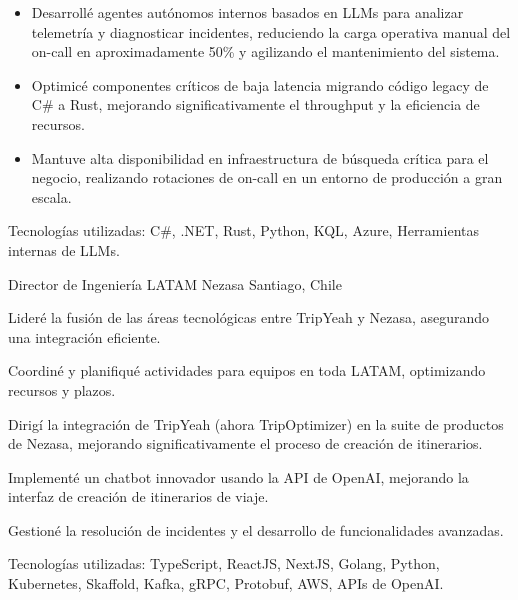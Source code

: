 \begin{cventries}
{\begin{cvitems}
{\begin{itemize}
                \item {Desarrollé agentes autónomos internos basados en LLMs para analizar telemetría y diagnosticar incidentes, reduciendo la carga operativa manual del on-call en aproximadamente 50\% y agilizando el mantenimiento del sistema.}
                \item {Optimicé componentes críticos de baja latencia migrando código legacy de C\# a Rust, mejorando significativamente el throughput y la eficiencia de recursos.}
                \item {Mantuve alta disponibilidad en infraestructura de búsqueda crítica para el negocio, realizando rotaciones de on-call en un entorno de producción a gran escala.}
              \end{itemize}
            }
            \item {Tecnologías utilizadas: C\#, .NET, Rust, Python, KQL, Azure, Herramientas internas de LLMs.}
        \end{cvitems}
    }
  \cventry
    {Director de Ingeniería LATAM} %
    {Nezasa} %
    {Santiago, Chile} %
    {} %
    {
      \begin{cvitems} %
        \item {Lideré la fusión de las áreas tecnológicas entre TripYeah y Nezasa, asegurando una integración eficiente.}
        \item {Coordiné y planifiqué actividades para equipos en toda LATAM, optimizando recursos y plazos.}
        \item {Dirigí la integración de TripYeah (ahora TripOptimizer) en la suite de productos de Nezasa, mejorando significativamente el proceso de creación de itinerarios.}
        \item {Implementé un chatbot innovador usando la API de OpenAI, mejorando la interfaz de creación de itinerarios de viaje.}
        \item {Gestioné la resolución de incidentes y el desarrollo de funcionalidades avanzadas.}
        \item {Tecnologías utilizadas: TypeScript, ReactJS, NextJS, Golang, Python, Kubernetes, Skaffold, Kafka, gRPC, Protobuf, AWS, APIs de OpenAI.}
      \end{cvitems}
    }


\end{cventries}
